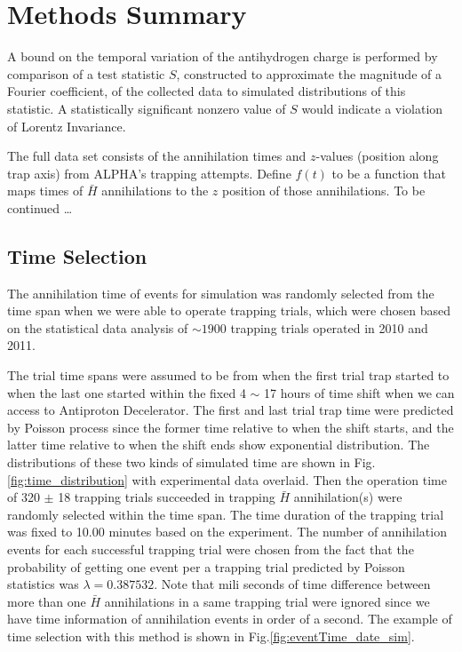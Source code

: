 \documentclass[superscriptaddress,aps,prb,11pt]{revtex4-1}
\begin{document}
\section{Methods Summary}
A bound on the temporal variation of the antihydrogen charge is performed by comparison of a test statistic $S$, constructed to approximate the magnitude of a Fourier coefficient, of the collected data to simulated distributions of this statistic.  A statistically significant nonzero value of $S$ would indicate a violation of Lorentz Invariance.

The full data set consists of the annihilation times and $z$-values (position along trap axis) from ALPHA's trapping attempts.  Define $f(t)$ to be a function that maps times of $\bar{H}$ annihilations to the $z$ position of those annihilations.  To be continued \ldots

\subsection*{Time Selection}
 The annihilation time of events for simulation was randomly selected from the time span when we were able to operate trapping trials, which were chosen based on the statistical data analysis of $\sim 1900$  trapping trials operated in 2010 and 2011.

 The trial time spans were assumed to be from when the first trial trap started to when the last one started within the fixed  4 $\sim$ 17 hours of time shift when we can access to Antiproton Decelerator. The first and last trial trap time were predicted by Poisson process since the former time relative to when the shift starts, and the latter time relative to when the shift ends show exponential distribution. The distributions of these two kinds of simulated time are shown in Fig.\ref{fig:time_distribution} with experimental data overlaid. Then the operation time of 320 $\pm$ 18 trapping trials succeeded in trapping $\bar{H}$ annihilation(s) were randomly selected within the time span. The time duration of the trapping trial was fixed to 10.00 minutes based on the experiment. The number of annihilation events for each successful trapping trial were chosen from the fact that the probability of getting one event per a trapping trial predicted by Poisson statistics was $\lambda=0.387532$. Note that mili seconds of time difference between more than one $\bar{H}$ annihilations in a same trapping trial were ignored since we have time information of annihilation events in order of a second. The example of time selection with this method is shown in Fig.\ref{fig:eventTime_date_sim}.
\end{document}
